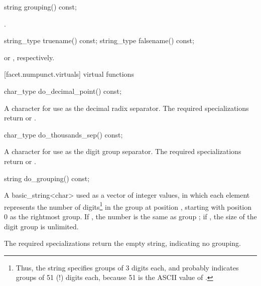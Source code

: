 %
\begin{itemdecl}
string grouping()  const;
\end{itemdecl}

\begin{itemdescr}
\pnum
\returns
{}.
\end{itemdescr}

%
%
\begin{itemdecl}
string_type truename()  const;
string_type falsename() const;
\end{itemdecl}

\begin{itemdescr}
\pnum
\returns
{}
or
,
respectively.
\end{itemdescr}

[facet.numpunct.virtuals]{ virtual functions}

%
\begin{itemdecl}
char_type do_decimal_point() const;
\end{itemdecl}

\begin{itemdescr}
\pnum
\returns
A character for use as the decimal radix separator.
The required specializations return  or .
\end{itemdescr}

%
\begin{itemdecl}
char_type do_thousands_sep() const;
\end{itemdecl}

\begin{itemdescr}
\pnum
\returns
A character for use as the digit group separator.
The required specializations return  or .
\end{itemdescr}

%
\begin{itemdecl}
string do_grouping() const;
\end{itemdecl}

\begin{itemdescr}
\pnum
\returns
A basic_string<char>  used as a vector of integer values,
in which each element
represents the number of digits\footnote{Thus, the string
 specifies groups of 3 digits each, and
 probably indicates groups of 51 (!) digits each,
because 51 is the ASCII value of .}
in the group at position , starting with position 0 as the
rightmost group.
If
,
the number is the same as group
;
if
,
the size of the digit group is unlimited.

\pnum
The required specializations return the empty string, indicating
no grouping.
\end{itemdescr}

